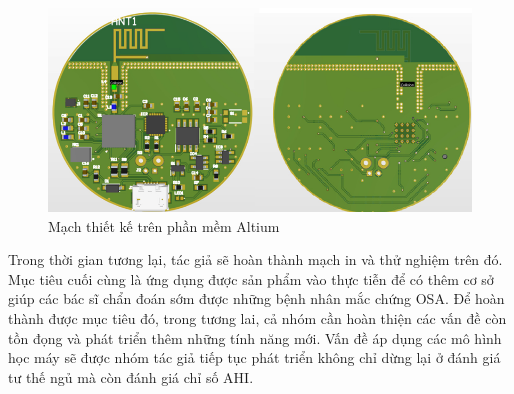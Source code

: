 \begin{figure}
    \centering
    \includegraphics[width=0.75\linewidth]{images/macjh.png}
    \caption{Mạch thiết kế trên phần mềm Altium}
    \label{macjh}
\end{figure}

Trong thời gian tương lại, tác giả sẽ hoàn thành mạch in và thử nghiệm trên đó.
Mục tiêu cuối cùng là ứng dụng được sản phẩm vào thực tiễn để có thêm cơ sở giúp các bác sĩ chẩn đoán sớm được những bệnh nhân mắc chứng OSA. Để hoàn thành được mục tiêu đó, trong tương lai, cả nhóm cần hoàn thiện các vấn đề còn tồn đọng và phát triển thêm những tính năng mới. Vấn đề áp dụng các mô hình học máy sẽ được nhóm tác giả tiếp tục phát triển không chỉ dừng lại ở đánh giá tư thế ngủ mà còn đánh giá chỉ số AHI.
